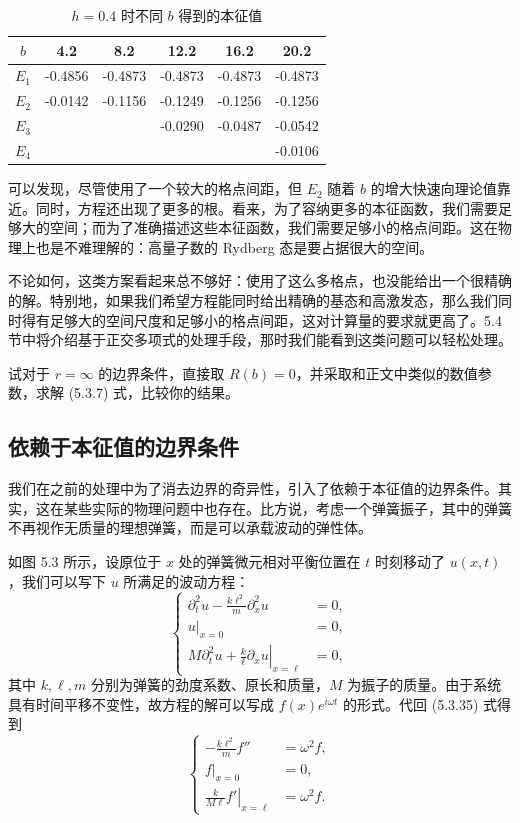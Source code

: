 \begin{table}[htbp]
\centering
\caption{$h=0.4$ 时不同 $b$ 得到的本征值}
\begin{tabular}{@{}cccccc@{}}
\toprule
$b$&4.2&8.2&12.2&16.2&20.2\\
\midrule
$E_1$&-0.4856&-0.4873&-0.4873&-0.4873&-0.4873\\
$E_2$&-0.0142&-0.1156&-0.1249&-0.1256&-0.1256\\
$E_3$&&&-0.0290&-0.0487&-0.0542\\
$E_4$&&&&&-0.0106\\
\bottomrule
\end{tabular}
\end{table}
可以发现，尽管使用了一个较大的格点间距，但 $E_2$ 随着 $b$ 的增大快速向理论值靠近。同时，方程还出现了更多的根。看来，为了容纳更多的本征函数，我们需要足够大的空间；而为了准确描述这些本征函数，我们需要足够小的格点间距。这在物理上也是不难理解的：高量子数的 Rydberg 态是要占据很大的空间。

不论如何，这类方案看起来总不够好：使用了这么多格点，也没能给出一个很精确的解。特别地，如果我们希望方程能同时给出精确的基态和高激发态，那么我们同时得有足够大的空间尺度和足够小的格点间距，这对计算量的要求就更高了。5.4 节中将介绍基于正交多项式的处理手段，那时我们能看到这类问题可以轻松处理。

\begin{exerciseBox}[练习 5.2]
试对于 $r=\infty$ 的边界条件，直接取 $R(b)=0$，并采取和正文中类似的数值参数，求解 (5.3.7) 式，比较你的结果。
\end{exerciseBox}

\subsection{依赖于本征值的边界条件}

我们在之前的处理中为了消去边界的奇异性，引入了依赖于本征值的边界条件。其实，这在某些实际的物理问题中也存在。比方说，考虑一个弹簧振子，其中的弹簧不再视作无质量的理想弹簧，而是可以承载波动的弹性体。

如图 5.3 所示，设原位于 $x$ 处的弹簧微元相对平衡位置在 $t$ 时刻移动了 $u(x,t)$，我们可以写下 $u$ 所满足的波动方程：
\begin{equation}
\left\{
\begin{aligned}
\partial_t^2u-\frac{k\ell^2}{m}\partial_x^2u&=0,\\
u|_{x=0}&=0,\\
\left.M\partial_t^2u+\frac{k}{\ell}\partial_xu\right|_{x=\ell}&=0,
\end{aligned}\right.
\tag{5.3.35}
\end{equation}
其中 $k,\ell,m$ 分别为弹簧的劲度系数、原长和质量，$M$ 为振子的质量。由于系统具有时间平移不变性，故方程的解可以写成 $f(x)e^{i\omega t}$ 的形式。代回 (5.3.35) 式得到
\begin{equation}
\left\{
\begin{aligned}
-\frac{k\ell^2}{m}f''&=\omega^2f,\\
f|_{x=0}&=0,\\
\left.\frac{k}{M\ell}f'\right|_{x=\ell}&=\omega^2f.
\end{aligned}\right.
\tag{5.3.36}
\end{equation}

